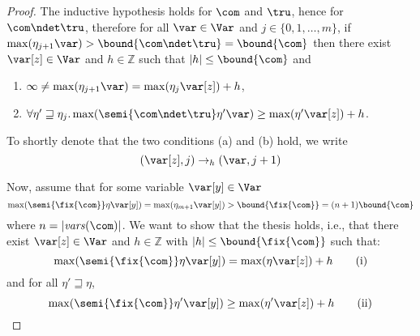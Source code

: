 \begin{proof}
  The inductive hypothesis holds for \(\com\) and \(\tru\), hence for
  \(\com \ndet \tru\), therefore for all \(\var \in \Var\) and
  \(j \in \{0,1, \ldots, m\}\), if \(\max(\eta_{j+1} \var) >\bound{\com\ndet \tru} =\bound{\com}\) then
  there exist \(\var[z] \in \Var\) and \(h \in \mathbb{Z}\) such that \(|h| \leq \bound{\com}\) and 
  \begin{enumerate}[label=(\alph*)]
  \item \(\infty \neq \max(\eta_{j+1} \var) = \max(\eta_j \var[z]) + h\),
  \item \(\forall \eta' \sqsupseteq \eta_j.
    \max(\semi{\com \ndet \tru}\eta'\var) \geq \max(\eta' \var[z]) + h\).
  \end{enumerate}
  To shortly denote that the two conditions (a) and (b) hold, we write
  \[
  (\var[z],j) \to_{h} (\var, j+1)
  \]
  
  Now, assume that for some variable \(\var[y] \in \Var\)
  \[\max(\semi{\fix{\com}} \eta \var[y]) = \max(\eta_{m+1} \var[y]) >
  \bound{\fix{\com}} = (n+1) \bound{\com}\]
  where \(n=|\mathit{vars}(\com)|\). 
  We want to show that the thesis holds, i.e., that there exist
  \(\var[z] \in \Var\) and \(h \in \mathbb{Z}\) with
  \(|h| \leq \bound{\fix{\com}}\) such that:
  \begin{equation}\label{eq:maxendmaxstart}
    \max(\semi{\fix{\com}} \eta \var[y]) = \max(\eta \var[z]) + h
    \tag{i}
  \end{equation}
  and for all \(\eta' \sqsupseteq \eta\),
  \begin{equation}\label{eq:maxmiddlemaxend}
    \max(\semi{\fix{\com}} \eta' \var[y]) \geq \max(\eta' \var[z]) + h
    \tag{ii}
  \end{equation}
  

\end{proof}
